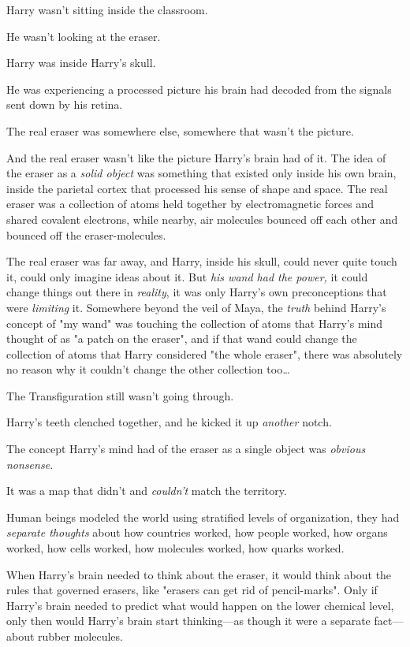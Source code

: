 Harry wasn't sitting inside the classroom.

He wasn't looking at the eraser.

Harry was inside Harry's skull.

He was experiencing a processed picture his brain had decoded from the signals
sent down by his retina.

The real eraser was somewhere else, somewhere that wasn't the picture.

And the real eraser wasn't like the picture Harry's brain had of it. The idea
of the eraser as a \emph{solid object} was something that existed only inside
his own brain, inside the parietal cortex that processed his sense of shape and
space. The real eraser was a collection of atoms held together by
electromagnetic forces and shared covalent electrons, while nearby, air
molecules bounced off each other and bounced off the eraser-molecules.

The real eraser was far away, and Harry, inside his skull, could never quite
touch it, could only imagine ideas about it. But \emph{his wand had the power,}
it could change things out there in \emph{reality}, it was only Harry's own
preconceptions that were \emph{limiting} it. Somewhere beyond the veil of Maya,
the \emph{truth} behind Harry's concept of "my wand" was touching the
collection of atoms that Harry's mind thought of as "a patch on the eraser",
and if that wand could change the collection of atoms that Harry considered
"the whole eraser", there was absolutely no reason why it couldn't change the
other collection too{\ldots}

The Transfiguration still wasn't going through.

Harry's teeth clenched together, and he kicked it up \emph{another} notch.

The concept Harry's mind had of the eraser as a single object was \emph{obvious
nonsense.}

It was a map that didn't and \emph{couldn't} match the territory.

Human beings modeled the world using stratified levels of organization, they
had \emph{separate thoughts} about how countries worked, how people worked, how
organs worked, how cells worked, how molecules worked, how quarks worked.

When Harry's brain needed to think about the eraser, it would think about the
rules that governed erasers, like "erasers can get rid of pencil-marks". Only
if Harry's brain needed to predict what would happen on the lower chemical
level, only then would Harry's brain start thinking---as though it were a
separate fact---about rubber molecules.

